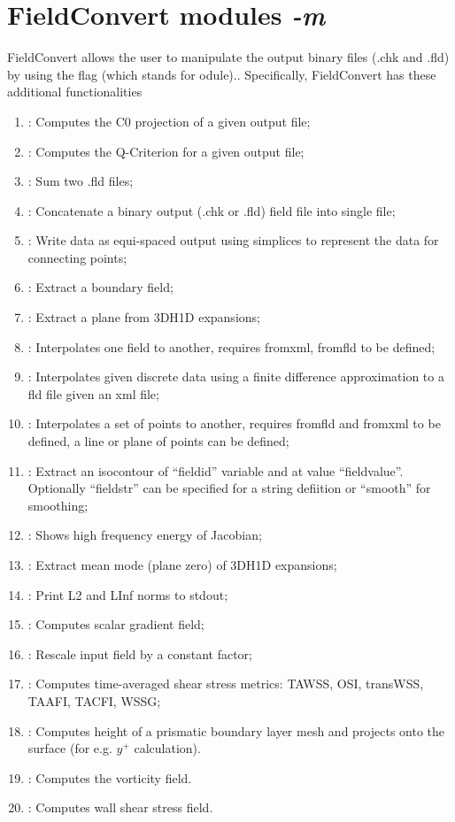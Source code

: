 \section{FieldConvert modules \textit{-m}}
FieldConvert allows the user to manipulate the \nekpp output 
binary files (.chk and .fld) by using the flag  (which 
stands for odule).. 
Specifically, FieldConvert has these additional functionalities
%
\begin{enumerate}
\item {}: Computes the C0 projection of a given output file;
\item {}: Computes the Q-Criterion for a given output file;
\item {}: Sum two .fld files;
\item {}: Concatenate a \nekpp binary output (.chk or .fld) field file into single file;
\item {}: Write data as equi-spaced output using simplices to represent the data for connecting points;
\item {}: Extract a boundary field;
\item {}: Extract a plane from 3DH1D expansions;
\item {}: Interpolates one field to another, requires fromxml, fromfld to be defined;
\item {}: Interpolates given discrete data using a finite difference approximation to a fld file given an xml file;
\item {}: Interpolates a set of points to another, requires fromfld and fromxml to be defined, a line or plane of points can be defined;
\item {}: Extract an isocontour of ``fieldid'' variable and at value ``fieldvalue''. Optionally ``fieldstr'' can be specified for a string defiition or ``smooth'' for smoothing; 
\item {}: Shows high frequency energy of Jacobian;
\item {}: Extract mean mode (plane zero) of 3DH1D expansions;
\item {}: Print L2 and LInf norms to stdout;
\item {}: Computes scalar gradient field;
\item {}: Rescale input field by a constant factor;
\item {}: Computes time-averaged shear stress metrics: TAWSS, OSI, transWSS, TAAFI, TACFI, WSSG;
\item {}: Computes height of a prismatic boundary layer mesh and projects onto the surface (for e.g. $y^+$ calculation).
\item {}: Computes the vorticity field.
\item {}: Computes wall shear stress field.
\end{enumerate}
